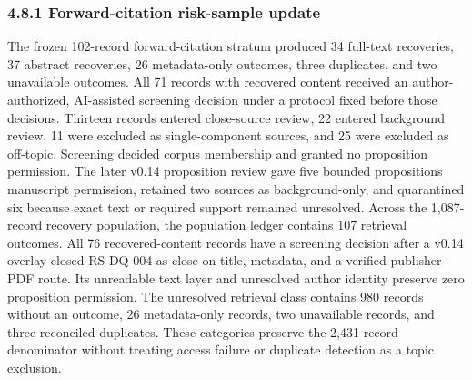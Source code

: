 \documentclass[11pt]{article}
\begin{document}
\subsubsection*{4.8.1 Forward-citation risk-sample update}
The frozen 102-record forward-citation stratum produced 34 full-text recoveries, 37 abstract recoveries, 26 metadata-only outcomes, three duplicates, and two unavailable outcomes. All 71 records with recovered content received an author-authorized, AI-assisted screening decision under a protocol fixed before those decisions. Thirteen records entered close-source review, 22 entered background review, 11 were excluded as single-component sources, and 25 were excluded as off-topic. Screening decided corpus membership and granted no proposition permission. The later v0.14 proposition review gave five bounded propositions manuscript permission, retained two sources as background-only, and quarantined six because exact text or required support remained unresolved.
Across the 1,087-record recovery population, the population ledger contains 107 retrieval outcomes. All 76 recovered-content records have a screening decision after a v0.14 overlay closed RS-DQ-004 as close on title, metadata, and a verified publisher-PDF route. Its unreadable text layer and unresolved author identity preserve zero proposition permission. The unresolved retrieval class contains 980 records without an outcome, 26 metadata-only records, two unavailable records, and three reconciled duplicates. These categories preserve the 2,431-record denominator without treating access failure or duplicate detection as a topic exclusion.
\end{document}
